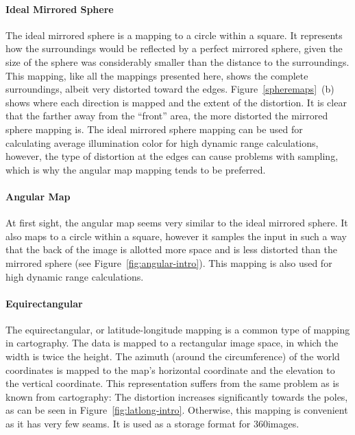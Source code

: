\paragraph{Ideal Mirrored Sphere}
The ideal mirrored sphere is a mapping to a circle within a square. It represents how the surroundings would be reflected by a perfect mirrored sphere, given the size of the sphere was considerably smaller than the distance to the surroundings. This mapping, like all the mappings presented here, shows the complete surroundings, albeit very distorted toward the edges. Figure~\ref{spheremaps}~(b) shows where each direction is mapped and the extent of the distortion. It is clear that the farther away from the ``front'' area, the more distorted the mirrored sphere mapping is. The ideal mirrored sphere mapping can be used for calculating average illumination color for high dynamic range calculations, however, the type of distortion at the edges can cause problems with sampling, which is why the angular map mapping tends to be preferred.
\cite{hdrbook}

\paragraph{Angular Map}
At first sight, the angular map seems very similar to the ideal mirrored sphere. It also maps to a circle within a square, however it samples the input in such a way that the back of the image is allotted more space and is less distorted than the mirrored sphere (see Figure~\ref{fig:angular-intro}). This mapping is also used for high dynamic range calculations.

\paragraph{Equirectangular}
The equirectangular, or latitude-longitude mapping is a common type of mapping in cartography. The data is mapped to a rectangular image space, in which the width is twice the height. The azimuth (around the circumference) of the world coordinates is mapped to the map's horizontal coordinate and the elevation to the vertical coordinate. This representation suffers from the same problem as is known from cartography: The distortion increases significantly towards the poles, as can be seen in Figure~\ref{fig:latlong-intro}. Otherwise, this mapping is convenient as it has very few seams. It is used as a storage format for 360\degree images.

